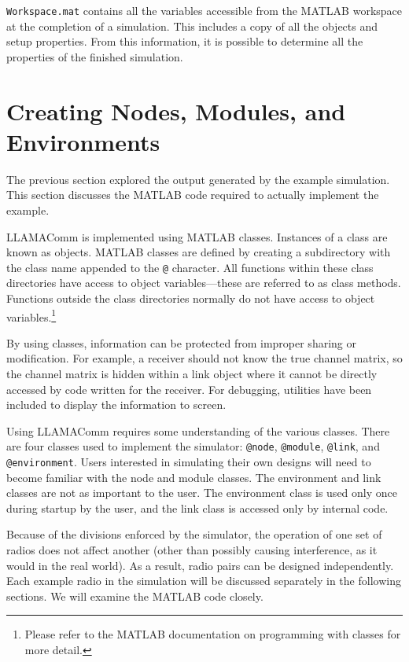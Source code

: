 \verb+Workspace.mat+ contains all the variables accessible from the
MATLAB workspace at the completion of a simulation.  This includes a
copy of all the objects and setup properties.  From this
information, it is possible to determine all the properties of the
finished simulation.

\section{Creating Nodes, Modules, and Environments}
\label{sec:exampleSection}

The previous section explored the output generated by the example
simulation.  This section discusses the MATLAB code required to
actually implement the example.

LLAMAComm is implemented using MATLAB classes.  Instances of a class
are known as objects.  MATLAB classes are defined by creating a
subdirectory with the class name appended to the \verb+@+ character.
All functions within these class directories have access to object
variables---these are referred to as class methods.  Functions
outside the class directories normally do not have access to object
variables.\footnote{Please refer to the MATLAB documentation on
programming with classes for more detail.}

By using classes, information can be protected from improper sharing
or modification.  For example, a receiver should not know the true
channel matrix, so the channel matrix is hidden within a link object
where it cannot be directly accessed by code written for the
receiver.  For debugging, utilities have been included to display
the information to screen.

Using LLAMAComm requires some understanding of the various classes.
There are four classes used to implement the simulator:
\verb+@node+, \verb+@module+, \verb+@link+, and \verb+@environment+.
Users interested in simulating their own designs will need to become
familiar with the node and module classes. The environment and link
classes are not as important to the user.  The environment class is
used only once during startup by the user, and the link class is
accessed only by internal code.

Because of the divisions enforced by the simulator, the operation of
one set of radios does not affect another (other than possibly
causing interference, as it would in the real world).  As a result,
radio pairs can be designed independently.  Each example radio in
the simulation will be discussed separately in the following
sections. We will examine the MATLAB code closely.

